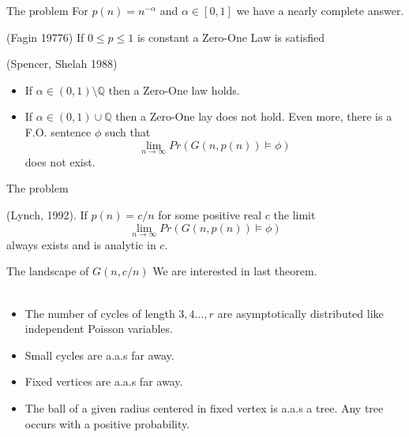 \documentclass[handout, 11pt]{beamer}
\newcommand{\Ln}{\lim\limits_{n\to \infty}}
\begin{document}
\begin{frame}{The problem}	
For $p(n)=n^{-\alpha}$ and $\alpha\in [0,1]$ we have a nearly complete answer.
\begin{theorem}{(Fagin 19776)} If $0\leq p \leq 1$ is constant a Zero-One Law is satisfied
\end{theorem}
\begin{theorem}{(Spencer, Shelah 1988)} 
	\begin{itemize}
		\item If $\alpha \in (0,1)\setminus \mathbb{Q}$ then
		a Zero-One law holds.
		\item If $\alpha \in (0,1)\cup \mathbb{Q}$ then a Zero-One
		lay does not hold. Even more, there is a F.O. sentence
		$\phi$ such that
		\[ \Ln Pr(G(n,p(n))\models \phi) \]   
		does not exist.
	\end{itemize}
\end{theorem}

\end{frame}

\begin{frame}{The problem}
\begin{theorem}{(Lynch, 1992).} 
	If $p(n)=c/n$ for some positive real $c$
	the limit
	\[ \Ln Pr(G(n,p(n))\models \phi)\]
	always exists and is analytic in $c$.  
\end{theorem}
\end{frame}

\begin{frame}{The landscape of $G(n,c/n)$}
	We are interested in last theorem.\\~\\
	\begin{itemize}
		\item The number of cycles of 
		length $3,4\dots, r$
		are asymptotically distributed like independent Poisson 
		variables.
		\item Small cycles are a.a.s far away.
		\item Fixed vertices are a.a.s far away.
		\item The ball of a given radius centered in fixed
		vertex is a.a.s a tree. Any tree occurs with a positive 
		probability.
	\end{itemize}
\end{frame}
\end{document}
